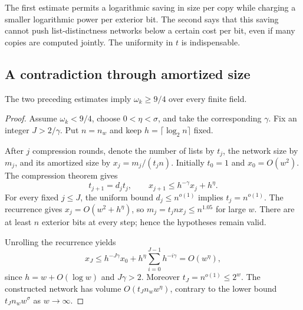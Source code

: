 The first estimate permits a logarithmic saving in size per copy while charging a smaller logarithmic power per exterior bit. The second says that this saving cannot push list-distinctness networks below a certain cost per bit, even if many copies are computed jointly. The uniformity in \(t\) is indispensable.

\subsection{A contradiction through amortized size}

\begin{proposition}
\label{prop:mm-nine-fourths-finite-lower}
The two preceding estimates imply \(\omega_k\geq9/4\) over every finite field.
\end{proposition}
\begin{proof}
Assume \(\omega_k<9/4\), choose \(0<\eta<\sigma\), and take the corresponding \(\gamma\). Fix an integer \(J>2/\gamma\). Put \(n=n_w\) and keep \(h=\lceil\log_2 n\rceil\) fixed.

After \(j\) compression rounds, denote the number of lists by \(t_j\), the network size by \(m_j\), and its amortized size by \(x_j=m_j/(t_j n)\). Initially \(t_0=1\) and \(x_0=O(w^2)\). The compression theorem gives
\[
 t_{j+1}=d_jt_j,\qquad
 x_{j+1}\leq h^{-\gamma}x_j+h^\eta.
\]
For every fixed \(j\leq J\), the uniform bound \(d_j\leq n^{o(1)}\) implies \(t_j=n^{o(1)}\). The recurrence gives \(x_j=O(w^2+h^\eta)\), so \(m_j=t_jnx_j\leq n^{1.05}\) for large \(w\). There are at least \(n\) exterior bits at every step; hence the hypotheses remain valid.

Unrolling the recurrence yields
\[
 x_J\leq h^{-J\gamma}x_0+
 h^\eta\sum_{i=0}^{J-1}h^{-i\gamma}=O(w^\eta),
\]
since \(h=w+O(\log w)\) and \(J\gamma>2\). Moreover \(t_J=n^{o(1)}\leq2^w\). The constructed network has volume \(O(t_J n_w w^\eta)\), contrary to the lower bound \(t_J n_w w^\sigma\) as \(w\to\infty\).
\end{proof}

